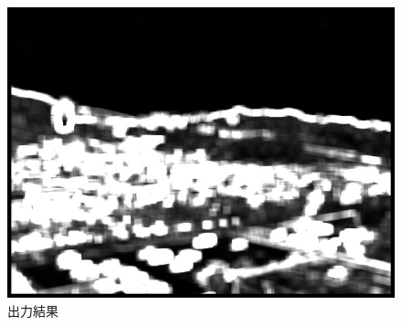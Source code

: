 \documentclass[11pt]{jarticle}
\begin{document}
\begin{figure}[t]
    \centering
    \includegraphics[scale=.5]{out1.jpg}
    \caption{出力結果}
    \label{out1}
\end{figure}
\end{document}

